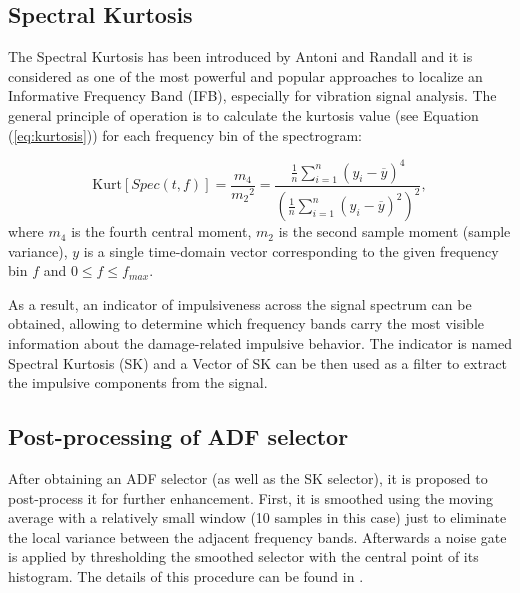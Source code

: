 \documentclass[11pt]{article}
\begin{document}
\subsection{Spectral Kurtosis}

The Spectral Kurtosis has been introduced by Antoni and Randall \cite{ANTONI2006308,ANTONI2006282} and it is considered as one of the most powerful  and popular approaches to localize an Informative Frequency Band (IFB), especially for  vibration signal analysis. The general principle of operation is to calculate the kurtosis value (see Equation (\ref{eq:kurtosis})) for  each  frequency  bin  of  the spectrogram: 

\begin{equation}
\label{eq:kurtosis}
\textrm{Kurt}[Spec(t,f)]=\frac{m_4}{{m_2}^2}=\frac{\frac{1}{n} \sum_{i=1}^{n} \left(y_i - \overline{y} \right)^4}{\left({\frac{1}{n} \sum_{i=1}^{n} \left(y_i - \overline{y} \right)^2}\right)^2},
\end{equation}
where $m_4$ is the fourth central moment, $m_2$ is the second sample moment (sample variance), $y$ is a single time-domain vector corresponding to the given frequency bin $f$ and $0\leq f\leq f_{max}$.

As a result, an indicator of impulsiveness across the signal spectrum can be obtained, allowing to determine which frequency bands carry the most visible information about the damage-related impulsive behavior.  The indicator is named Spectral Kurtosis (SK) and a Vector of SK can be then used as a filter to extract the impulsive components from the signal.

\subsection{Post-processing of ADF selector}
After obtaining an ADF selector (as well as the SK selector),  it is proposed to post-process it for further enhancement. First, it is smoothed using the moving average with a relatively small window (10 samples in this case) just to eliminate the local variance between the adjacent frequency bands. Afterwards a noise gate is applied by thresholding the smoothed selector with the central point of its histogram. The details of this procedure can be found in \cite{daponte2003ieee}.
\end{document}
